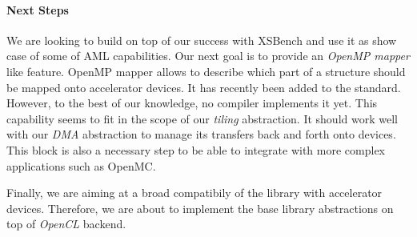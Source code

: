 \paragraph{Next Steps}


We are looking to build on top of our success with XSBench and use it as show
case of some of AML capabilities. Our next goal is to provide an \emph{OpenMP mapper}
like feature. OpenMP mapper allows to describe which part of a structure should be mapped onto
accelerator devices. It has recently been added to the standard. However, to the best
of our knowledge, no compiler implements it yet. This capability seems to fit in the
scope of our \emph{tiling} abstraction. It should work well with our \emph{DMA}
abstraction to manage its transfers back and forth onto devices. This block is also a
necessary step to be able to integrate with more complex applications such as OpenMC.

Finally, we are aiming at a broad compatibily of the library with accelerator devices.
Therefore, we are about to implement the base library abstractions on top of \emph{OpenCL}
backend.
